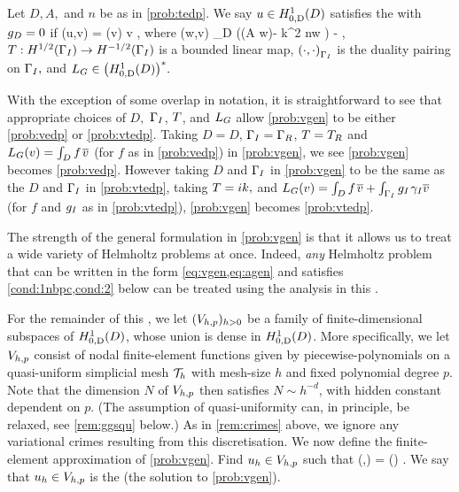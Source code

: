 \label{prob:vgen}
Let $D, A,$ and $n$ be as in \cref{prob:tedp}. We say $u \in \HozDD$ satisfies the  with $g_{D} = 0$ if
\beq\label{eq:vgen}
\aG(u,v) = \LG(v) \tfa v \in \HozDD,
\eeq
where
\beq\label{eq:agen}
\aG(w,v) \de \int_{D} \mleft(\mleft(A \grad w\mright)\cdot\grad \vbar - k^2 n\minispace w \vbar\mright) - ,
\eeq
$\T:\HhGI\rightarrow \HmhGI$ is a bounded linear map,  $\DPGI{\cdot}{\cdot}$ is the duality pairing on $\Gamma_{I},$ and $\LG  \in \HozDDs.$
\eprob

With the exception of some overlap in notation, it is straightforward to see that appropriate choices of $D,$ $\Gamma_{I}$, $T$, and $L_{G}$ allow \cref{prob:vgen} to be either \cref{prob:vedp} or \cref{prob:vtedp}. Taking $D = D$, $\Gamma_{I} = \Gamma_{R}$, $T = T_{R}$ and $L_{G}(v) = \int_{D} f\;\!\overline{v}$ (for $f$ as in \cref{prob:vedp}) in \cref{prob:vgen}, we see \cref{prob:vgen} becomes \cref{prob:vedp}. However taking $D$ and $\Gamma_{I}$ in \cref{prob:vgen} to be the same as the $D$ and $\Gamma_{I}$ in \cref{prob:vtedp}, taking $T=ik,$ and $L_{G}(v) = \int_{D} f\;\!\overline{v} + \int_{\Gamma_{I}} g_{I} \;\!\gamma_{I} \overline{v}$ (for $f$ and $g_{I}$ as in \cref{prob:vtedp}), \cref{prob:vgen} becomes \cref{prob:vtedp}.
\ere

The strength of the general formulation in \cref{prob:vgen} is that it allows us to treat a wide variety of Helmholtz problems at once. Indeed, \emph{any} Helmholtz problem that can be written in the form \cref{eq:vgen,eq:agen} and satisfies \cref{cond:1nbpc,cond:2} below can be treated using the analysis in this .
\ere 

For the remainder of this , we let $(V_{h,p})_{h>0}$ be a family of finite-dimensional subspaces of $\HozDD$, whose union is dense in $\HozDD$. More specifically, we let $V_{h,p}$ consist of nodal finite-element functions given by piecewise-polynomials on a quasi-uniform simplicial mesh $\mathcal T_{h}$ with mesh-size $h$
and fixed polynomial degree $p$. Note that the dimension $N$ of $V_{h,p}$ then satisfies $N\sim h^{-d}$, with hidden constant dependent on $p$. (The assumption of quasi-uniformity can, in principle, be relaxed, see \cref{rem:ggsqu} below.) As in \cref{rem:crimes} above, we ignore any variational crimes resulting from this discretisation. We now define the finite-element approximation of \cref{prob:vgen}.
\label{prob:fevgen}
    Find $u_{h} \in V_{h,p}$ such that
\beq\label{eq:galerkin}
\aG(\uh,\vh) = \LG(\vh) \tforall \vh \in \Vhp.
\eeq
We say that $u_{h} \in V_{h,p}$ is the  (the solution to \cref{prob:vgen}).
\eprob

